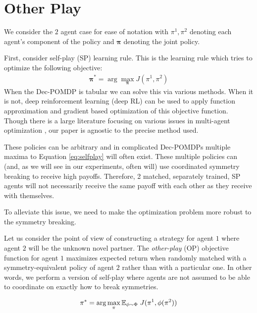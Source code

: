 \section{Other Play}
\label{sec:method}

We consider the $2$ agent case for ease of notation with $\pi^1, \pi^2$ denoting each agent's component of the policy and $\mathbf{\pi}$ denoting the joint policy.

First, consider self-play (SP) learning rule. This is the learning rule which tries to optimize the following objective: 
\begin{align}
    \mathbf{\pi}^* = \arg \max_{\mathbf{\pi}} J(\pi^1, \pi^2)
    \label{eq:selfplay}
\end{align}
When the Dec-POMDP is tabular we can solve this via various methods. When it is not, deep reinforcement learning (deep RL) can be used to apply function approximation and gradient based optimization of this objective function. Though there is a large literature focusing on various issues in multi-agent optimization \cite{busoniu2006multi,hernandez2019survey}, our paper is agnostic to the precise method used.

These policies can be arbitrary and in complicated Dec-POMDPs multiple maxima to Equation \ref{eq:selfplay} will often exist. These multiple policies can (and, as we will see in our experiments, often will) use coordinated symmetry breaking to receive high payoffs. Therefore, 2 matched, separately trained, SP agents will not necessarily receive the same payoff with each other as they receive with themselves.

To alleviate this issue, we need to make the optimization problem more robust to the symmetry breaking.

Let us consider the point of view of constructing a strategy for agent $1$ where agent $2$ will be the unknown novel partner. The \emph{other-play} (OP) objective function for agent $1$ maximizes expected return when randomly matched with a symmetry-equivalent policy of agent $2$ rather than with a particular one. In other words, we perform a version of self-play where agents are not assumed to be able to coordinate on exactly how to break symmetries. 

\begin{align}
    \mathbf{\pi}^* = \arg \max_{\mathbf{\pi}} \mathbb{E}_{\phi \sim \Phi} \hspace{1mm} { J(\pi^1,  \phi(\pi^2)) }
    \label{eq:otherplay}
\end{align}

